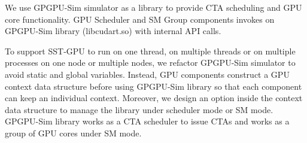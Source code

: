 We use GPGPU-Sim simulator as a library to provide CTA scheduling and GPU core
functionality. GPU Scheduler and SM Group components invokes on GPGPU-Sim library
(libcudart.so) with internal API calls.

To support SST-GPU to run on one thread, on multiple threads or on multiple
processes on one node or multiple nodes, we refactor GPGPU-Sim simulator to avoid
static and global variables. Instead, GPU components construct a GPU context data
structure before using GPGPU-Sim library so that each component can keep an
individual context. Moreover, we design an option inside the context data structure
to manage the library under scheduler mode or SM mode. GPGPU-Sim library works as
a CTA scheduler to issue CTAs and works as a group of GPU cores under SM mode.
